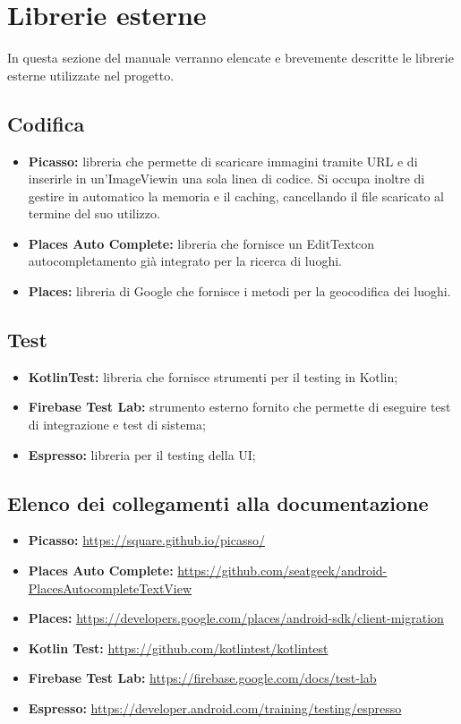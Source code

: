 \section{Librerie esterne}
In questa sezione del manuale verranno elencate e brevemente descritte le librerie esterne utilizzate nel progetto.
\subsection{Codifica}
\begin{itemize}
	\item \textbf{Picasso:} libreria che permette di scaricare immagini tramite URL e di inserirle in un'ImageView\glosp in una sola linea di codice. Si occupa inoltre di gestire in automatico la memoria e il caching, cancellando il file scaricato al termine del suo utilizzo.
	\item \textbf{Places Auto Complete:} libreria che fornisce un EditText\glosp con autocompletamento già integrato per la ricerca di luoghi.
	\item \textbf{Places:} libreria di Google che fornisce i metodi per la geocodifica dei luoghi.
\end{itemize}
\subsection{Test}
\begin{itemize}
	\item \textbf{KotlinTest:} libreria che fornisce strumenti per il testing in Kotlin;
	\item \textbf{Firebase Test Lab:} strumento esterno fornito che permette di eseguire
	test di integrazione e test di sistema;

	\item \textbf{Espresso:} libreria per il testing della UI;
\end{itemize}
\subsection{Elenco dei collegamenti alla documentazione}
\begin{itemize}
	\item \textbf{Picasso:} \url{https://square.github.io/picasso/}
	\item \textbf{Places Auto Complete:}
	\url{https://github.com/seatgeek/android-PlacesAutocompleteTextView}
	\item \textbf{Places:}
	\url{https://developers.google.com/places/android-sdk/client-migration}
	\item \textbf{Kotlin Test:}
	\url{https://github.com/kotlintest/kotlintest}
	\item \textbf{Firebase Test Lab:}
	\url{https://firebase.google.com/docs/test-lab}
	\item \textbf{Espresso:}
	\url{https://developer.android.com/training/testing/espresso}
\end{itemize}